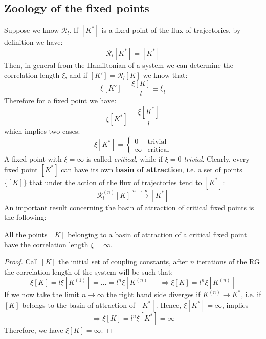 \documentclass[../../Main/Main.tex]{subfiles}
\begin{document}
 \subsection{Zoology of the fixed points}
 Suppose we know \( \mathcal{R}_{l} \). If \( [K^*] \) is a fixed point of the flux of trajectories, by definition we have:
 \begin{equation}
    \mathcal{R}_l [K^*] = [K^*]
 \end{equation}
 Then, in general from the Hamiltonian of a system we can determine the correlation length \( \xi  \), and if \( [K'] = \mathcal{R}_l [K] \)  we know that:
\begin{equation*}
  \xi [K'] = \frac{\xi [K]}{l} \equiv \xi _l
\end{equation*}
Therefore for a fixed point we have:
\begin{equation}
  \xi [K^*] = \frac{\xi [K^*]}{l}
\end{equation}
which implies two cases:
\begin{equation}
  \xi [K^*] =
  \begin{cases}
   0 & \text{trivial}\\
   \infty & \text{critical}
  \end{cases}
\end{equation}
A fixed point with \( \xi = \infty  \) is called \emph{critical}, while if \( \xi =0 \) \emph{trivial}. Clearly, every fixed point \( [K^*] \)  can have its own \textbf{basin of attraction}, i.e. a set of points \( \{ [K] \}   \) that under the action of the flux of trajectories tend to \( [K^*] \):
\begin{equation}
  \mathcal{R}_l^{(n)} [K] \overset{n \rightarrow \infty }{\longrightarrow} [K^*]
\end{equation}
An important result concerning the basin of attraction of critical fixed points is the following:


\begin{theorem}{}{}
All the points \([K]  \) belonging to a basin of attraction of a critical fixed point have the correlation length \( \xi = \infty  \).
\end{theorem}
\begin{proof}
  Call \( [K] \) the initial set of coupling constants, after \( n \)  iterations of the RG the correlation length of the system will be such that:
\begin{equation*}
  \xi [K] = l \xi [K^{(1)}] = \dots =l^n \xi [ K^{(n)}] \quad \Rightarrow \xi [K] = l^n \xi [ K^{(n)}]
\end{equation*}
If we now take the limit \( n \rightarrow \infty  \)  the right hand side diverges if \( K^{(n)} \rightarrow K^* \), i.e. if \( [K] \)  belongs to the basin of attraction of \( [K^*] \).
Hence, \( \xi [K^*] = \infty  \), implies
\begin{equation*}
  \Rightarrow \xi [K] = l^n \xi [K^*] = \infty
\end{equation*}
Therefore, we have \( \xi [K] = \infty  \).

\end{proof}
\end{document}
